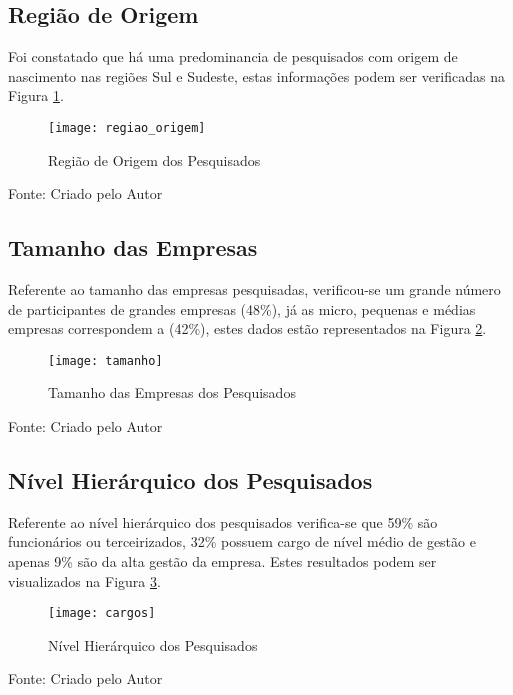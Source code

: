 \subsection{Região de Origem}

Foi constatado que há uma predominancia de pesquisados com origem de nascimento nas regiões Sul e Sudeste, estas informações podem ser verificadas na Figura \ref{fig:figura-rgorigem}.

\begin{figure}[H]
	\centering	
	\caption{Região de Origem dos Pesquisados}
	\texttt{[image: regiao\_origem]}
	\label{fig:figura-rgorigem}
\end{figure}
\vspace{-0.8 cm} \hspace{2.65 cm} Fonte: Criado pelo Autor\newline

\subsection{Tamanho das Empresas}

Referente ao tamanho das empresas pesquisadas, verificou-se um grande número de participantes de grandes empresas (48\%), já as micro, pequenas e médias empresas correspondem a (42\%), estes dados estão representados na Figura \ref{fig:figura-tamanho}.

\begin{figure}[H]
	\centering	
	\caption{Tamanho das Empresas dos Pesquisados}
	\texttt{[image: tamanho]}
	\label{fig:figura-tamanho}
\end{figure}
\vspace{-0.8 cm} \hspace{2.45 cm} Fonte: Criado pelo Autor\newline

\subsection{Nível Hierárquico dos Pesquisados}

Referente ao nível hierárquico dos pesquisados verifica-se que 59\% são funcionários ou terceirizados, 32\% possuem cargo de nível médio de gestão e apenas 9\% são da alta gestão da empresa. Estes resultados podem ser visualizados na Figura \ref{fig:figura-cargos}.

\begin{figure}[H]
	\centering	
	\caption{Nível Hierárquico dos Pesquisados}
	\texttt{[image: cargos]}
	\label{fig:figura-cargos}
\end{figure}
\vspace{-0.8 cm} \hspace{2.85 cm} Fonte: Criado pelo Autor\newline



